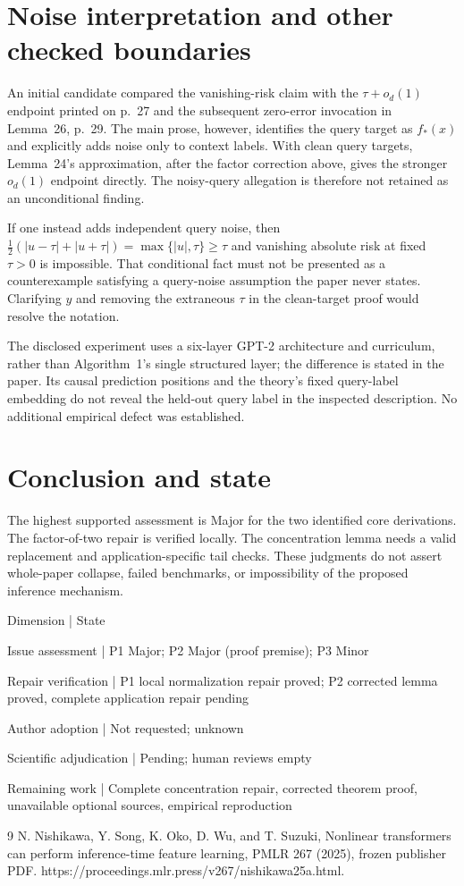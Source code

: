 \documentclass[10pt]{article}
\begin{document}
\section*{Noise interpretation and other checked boundaries}
An initial candidate compared the vanishing-risk claim with the \(\tau+o_d(1)\) endpoint printed on p. 27 and the subsequent zero-error invocation in Lemma 26, p. 29. The main prose, however, identifies the query target as \(f_*(x)\) and explicitly adds noise only to context labels. With clean query targets, Lemma 24’s approximation, after the factor correction above, gives the stronger \(o_d(1)\) endpoint directly. The noisy-query allegation is therefore not retained as an unconditional finding.\par
If one instead adds independent query noise, then \(\tfrac12(|u-\tau|+|u+\tau|)=\max\{|u|,\tau\}\ge\tau\) and vanishing absolute risk at fixed \(\tau>0\) is impossible. That conditional fact must not be presented as a counterexample satisfying a query-noise assumption the paper never states. Clarifying \(y\) and removing the extraneous \(\tau\) in the clean-target proof would resolve the notation.\par
The disclosed experiment uses a six-layer GPT-2 architecture and curriculum, rather than Algorithm 1’s single structured layer; the difference is stated in the paper. Its causal prediction positions and the theory’s fixed query-label embedding do not reveal the held-out query label in the inspected description. No additional empirical defect was established.\par
\section*{Conclusion and state}
The highest supported assessment is Major for the two identified core derivations. The factor-of-two repair is verified locally. The concentration lemma needs a valid replacement and application-specific tail checks. These judgments do not assert whole-paper collapse, failed benchmarks, or impossibility of the proposed inference mechanism.\par
Dimension | State\par
Issue assessment | P1 Major; P2 Major (proof premise); P3 Minor\par
Repair verification | P1 local normalization repair proved; P2 corrected lemma proved, complete application repair pending\par
Author adoption | Not requested; unknown\par
Scientific adjudication | Pending; human reviews empty\par
Remaining work | Complete concentration repair, corrected theorem proof, unavailable optional sources, empirical reproduction\par
9 N. Nishikawa, Y. Song, K. Oko, D. Wu, and T. Suzuki, Nonlinear transformers can perform inference-time feature learning, PMLR 267 (2025), frozen publisher PDF. https://proceedings.mlr.press/v267/nishikawa25a.html.\par
\end{document}
